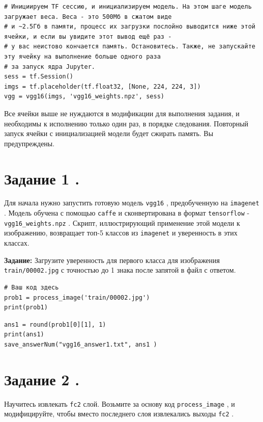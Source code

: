 \documentclass[11pt,a4paper]{article}
\begin{document}
\begin{verbatim}
# Инициируем TF сессию, и инициализируем модель. На этом шаге модель загружает веса. Веса - это 500Мб в сжатом виде
# и ~2.5Гб в памяти, процесс их загрузки послойно выводится ниже этой ячейки, и если вы увидите этот вывод ещё раз - 
# у вас неистово кончается память. Остановитесь. Также, не запускайте эту ячейку на выполнение больше одного раза
# за запуск ядра Jupyter.
sess = tf.Session()
imgs = tf.placeholder(tf.float32, [None, 224, 224, 3])
vgg = vgg16(imgs, 'vgg16_weights.npz', sess)
\end{verbatim}

Все ячейки выше не нуждаются в модификации для выполнения задания, и необходимы к исполнению только один раз, в порядке следования. Повторный запуск ячейки с инициализацией модели будет сжирать память. Вы предупреждены.

\section{Задание 1 .}

Для начала нужно запустить готовую модель \texttt{vgg16} , предобученную на \texttt{imagenet} . Модель обучена с помощью \texttt{caffe} и сконвертирована в формат \texttt{tensorflow} - \texttt{vgg16_weights.npz} . Скрипт, иллюстрирующий применение этой модели к изображению, возвращает топ-5 классов из \texttt{imagenet} и уверенность в этих классах.

\textbf{Задание:} Загрузите уверенность для первого класса для изображения \texttt{train/00002.jpg} с точностью до 1 знака после запятой в файл с ответом.

\begin{verbatim}
# Ваш код здесь
prob1 = process_image('train/00002.jpg')
print(prob1)
\end{verbatim}

\begin{verbatim}
ans1 = round(prob1[0][1], 1)
print(ans1)
save_answerNum("vgg16_answer1.txt", ans1 )
\end{verbatim}

\section{Задание 2 .}

Научитесь извлекать \texttt{fc2} слой. Возьмите за основу код \texttt{process_image} , и модифицируйте, чтобы вместо последнего слоя извлекались выходы \texttt{fc2} .
\end{document}
